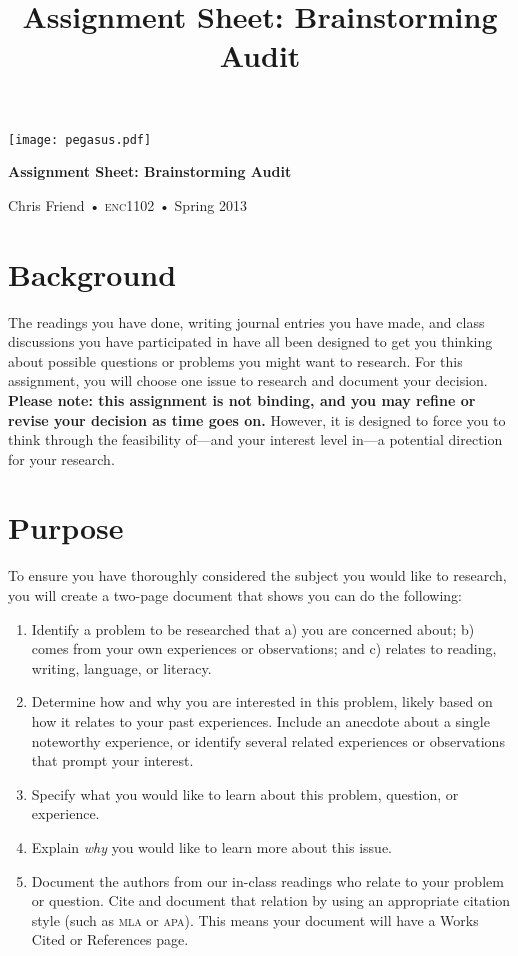 \documentclass[12pt,oneside]{amsart}	%
\title[Brainstorming Audit]{Assignment Sheet: Brainstorming Audit}
\begin{document}
%
\thispagestyle{empty}

\vspace{-2in}
\begin{center}
\huge
{\texttt{[image: pegasus.pdf]}}

\textbf{Assignment Sheet: Brainstorming Audit}

{\normalsize Chris Friend • \textsc{enc1102} • Spring 2013}
\end{center}
\vspace{1.5\baselineskip}

\section{Background} %
\label{sec:background}
The readings you have done, writing journal entries you have made, and class discussions you have participated in have all been designed to get you thinking about possible questions or problems you might want to research. For this assignment, you will choose one issue to research and document your decision. \textbf{Please note: this assignment is not binding, and you may refine or revise your decision as time goes on.} However, it is designed to force you to think through the feasibility of—and your interest level in—a potential direction for your research.

\section{Purpose} %
\label{sec:purpose}
To ensure you have thoroughly considered the subject you would like to research, you will create a two-page document that shows you can do the following:
\begin{enumerate}
	\item Identify a problem to be researched that a) you are concerned about; b)  comes from your own experiences or observations; and c) relates to reading, writing, language, or literacy.
	\item  Determine how and why you are interested in this problem, likely based on how it relates to your past experiences. Include an anecdote about a single noteworthy experience, or identify several related experiences or observations that prompt your interest.
	\item  Specify what you would like to learn about this problem, question, or experience.
	\item Explain \emph{why} you would like to learn more about this issue.
	\item  Document the authors from our in-class readings who relate to your problem or question. Cite and document that relation by using an appropriate citation style (such as \textsc{mla} or \textsc{apa}). This means your document will have a Works Cited or References page.
\end{enumerate}
\end{document}
